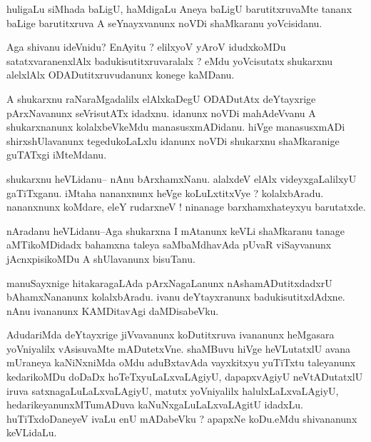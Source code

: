 \documentclass{article}
\begin{document}
\begin{mn}%
huligaLu siMhada baLigU, haMdigaLu Aneya baLigU barutitxruvaMte tananx baLige barutitxruva A 
seYnayxvanunx noVDi shaMkaranu yoVcisidanu.
\end{mn}

\begin{mn}%
Aga shivanu ideVnidu? EnAyitu ? elilxyoV yAroV idudxkoMDu satatxvaranenxlAlx 
badukisutitxruvaralalx ? eMdu yoVcisutatx shukarxnu alelxlAlx ODADutitxruvudanunx konege 
kaMDanu.
\end{mn}

\begin{mn}%
A shukarxnu raNaraMgadalilx elAlxkaDegU ODADutAtx deYtayxrige pArxNavanunx seVrisutATx 
idadxnu. idanunx noVDi mahAdeVvanu A shukarxnanunx kolalxbeVkeMdu manasusxmADidanu. hiVge 
manasusxmADi shirxshUlavanunx tegedukoLaLxlu idanunx noVDi shukarxnu shaMkaranige guTATxgi 
iMteMdanu.
\end{mn}

\begin{mn}%
shukarxnu heVLidanu-- nAnu bArxhamxNanu. alalxdeV elAlx videyxgaLalilxyU gaTiTxganu. iMtaha 
nananxnunx heVge koLuLxtitxVye ? kolalxbAradu. nananxnunx koMdare, eleY rudarxneV ! ninanage 
barxhamxhateyxyu barutatxde.
\end{mn}

\begin{mn}%
nAradanu heVLidanu--Aga shukarxna I mAtanunx keVLi shaMkaranu tanage aMTikoMDidadx bahamxna 
taleya saMbaMdhavAda pUvaR viSayvanunx jAcnxpisikoMDu A shUlavanunx bisuTanu.
\end{mn}

\begin{mn}%
manuSayxnige hitakaragaLAda pArxNagaLanunx nAshamADutitxdadxrU bAhamxNananunx kolalxbAradu. 
ivanu deYtayxranunx badukisutitxdAdxne. nAnu ivananunx KAMDitavAgi daMDisabeVku.
\end{mn}

\begin{mn}%
AdudariMda deYtayxrige jiVvavanunx koDutitxruva ivananunx heMgasara yoVniyalilx vAsisuvaMte 
mADutetxVne. shaMBuvu hiVge heVLutatxlU avana mUraneya kaNiNxniMda oMdu aduBxtavAda 
vayxkitxyu yuTiTxtu taleyanunx kedarikoMDu doDaDx hoTeTxyuLaLxvaLAgiyU, dapapxvAgiyU 
neVtADutatxlU iruva satxnagaLuLaLxvaLAgiyU, matutx yoVniyalilx halulxLaLxvaLAgiyU, 
hedarikeyanunxMTumADuva kaNuNxgaLuLaLxvaLAgitU idadxLu. huTiTxdoDaneyeV ivaLu enU mADabeVku 
? apapxNe koDu.eMdu shivananunx keVLidaLu.
\end{mn}
\end{document}
